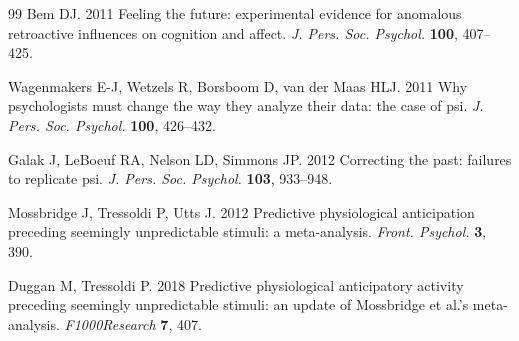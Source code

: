 \documentclass[11pt,a4paper]{article}
\theoremstyle{definition}
\begin{document}
\begin{thebibliography}{99}
Bem DJ. 2011 Feeling the future: experimental evidence for anomalous retroactive
influences on cognition and affect. \textit{J. Pers. Soc. Psychol.}
\textbf{100}, 407--425.

Wagenmakers E-J, Wetzels R, Borsboom D, van der Maas HLJ. 2011 Why psychologists
must change the way they analyze their data: the case of psi.
\textit{J. Pers. Soc. Psychol.} \textbf{100}, 426--432.

Galak J, LeBoeuf RA, Nelson LD, Simmons JP. 2012 Correcting the past: failures
to replicate psi. \textit{J. Pers. Soc. Psychol.} \textbf{103}, 933--948.

Mossbridge J, Tressoldi P, Utts J. 2012 Predictive physiological anticipation
preceding seemingly unpredictable stimuli: a meta-analysis.
\textit{Front. Psychol.} \textbf{3}, 390.

Duggan M, Tressoldi P. 2018 Predictive physiological anticipatory activity
preceding seemingly unpredictable stimuli: an update of Mossbridge et al.'s
meta-analysis. \textit{F1000Research} \textbf{7}, 407.

\end{thebibliography}
\end{document}
